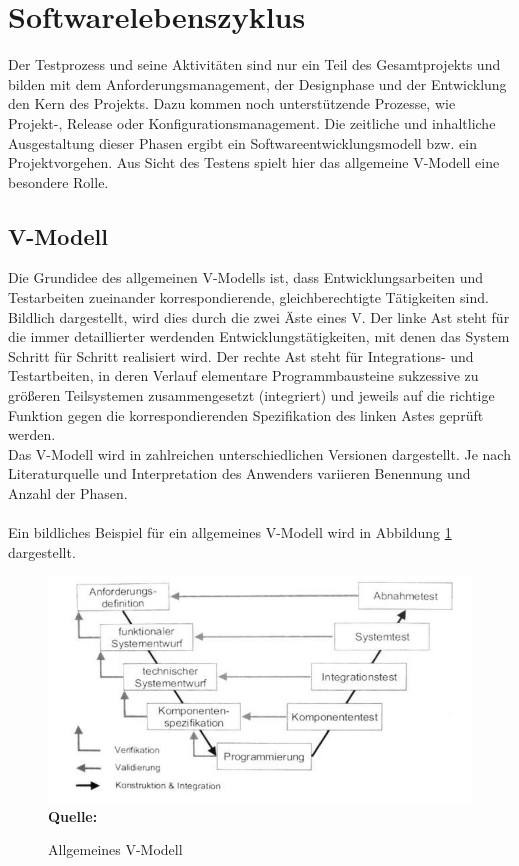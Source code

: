 \section{Softwarelebenszyklus}
\label{sec:softwarelebenszyklus}
Der Testprozess und seine Aktivitäten sind nur ein Teil des Gesamtprojekts und bilden mit dem Anforderungsmanagement, der Designphase und der Entwicklung den Kern des Projekts. Dazu kommen noch unterstützende Prozesse, wie Projekt-, Release oder Konfigurationsmanagement. Die zeitliche und inhaltliche Ausgestaltung dieser Phasen ergibt ein Softwareentwicklungsmodell bzw. ein Projektvorgehen. \cite{seidl_basiswissen_2012}
Aus Sicht des Testens spielt hier das allgemeine V-Modell eine besondere Rolle.


\subsection{V-Modell}
\label{subsec:vmodell}
Die Grundidee des allgemeinen V-Modells ist, dass Entwicklungsarbeiten und Testarbeiten zueinander korrespondierende, gleichberechtigte Tätigkeiten sind. Bildlich dargestellt, wird dies durch die zwei Äste eines \glqq V\grqq .
Der linke Ast steht für die immer detaillierter werdenden Entwicklungstätigkeiten, mit denen das System Schritt für Schritt realisiert wird. Der rechte Ast steht für Integrations- und Testartbeiten, in deren Verlauf elementare Programmbausteine sukzessive zu größeren Teilsystemen zusammengesetzt (integriert) und jeweils auf  die richtige Funktion gegen die korrespondierenden Spezifikation des linken Astes geprüft werden.
\cite{spillner_basiswissen_2007} \\
Das V-Modell wird in zahlreichen unterschiedlichen Versionen dargestellt. 
Je nach Literaturquelle und Interpretation des Anwenders variieren Benennung und Anzahl der Phasen.
\\ \\
Ein bildliches Beispiel für ein allgemeines V-Modell wird in Abbildung \ref{fig:vModel} dargestellt.\\

\begin{figure}[htb]
  \centering  
  \includegraphics[scale=0.8]{img/vModell.jpg}\\
  \footnotesize\sffamily\textbf{Quelle:} \cite{spillner_basiswissen_2007}
  \caption{Allgemeines V-Modell}
  \label{fig:vModel}
\end{figure}


